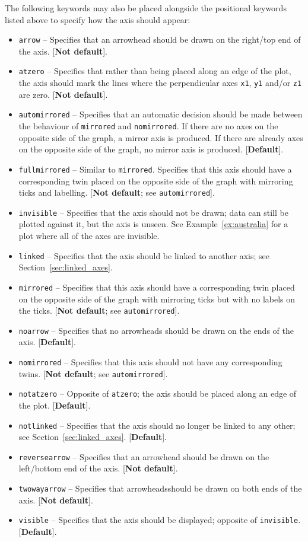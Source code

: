 The following keywords may also be placed alongside the positional keywords
listed above to specify how the axis should appear:
\begin{itemize}
\item {\tt arrow} -- Specifies that an arrowhead should be drawn on the right/top end of the axis. [{\bf Not default}].
\item {\tt atzero} -- Specifies that rather than being placed along an edge of the plot, the axis should mark the lines where the perpendicular axes {\tt x1}, {\tt y1} and/or {\tt z1} are zero. [{\bf Not default}].
\item {\tt automirrored} -- Specifies that an automatic decision should be made between the behaviour of {\tt mirrored} and {\tt nomirrored}. If there are no axes on the opposite side of the graph, a mirror axis is produced. If there are already axes on the opposite side of the graph, no mirror axis is produced. [{\bf Default}].
\item {\tt fullmirrored} -- Similar to {\tt mirrored}. Specifies that this axis should have a corresponding twin placed on the opposite side of the graph with mirroring ticks and labelling. [{\bf Not default}; see {\tt automirrored}].
\item {\tt invisible} -- Specifies that the axis should not be drawn; data can still be plotted against it, but the axis is unseen. See Example~\ref{ex:australia} for a plot where all of the axes are invisible.
\item {\tt linked} -- Specifies that the axis should be linked to another axis; see Section~\ref{sec:linked_axes}.
\item {\tt mirrored} -- Specifies that this axis should have a corresponding twin placed on the opposite side of the graph with mirroring ticks but with no labels on the ticks. [{\bf Not default}; see {\tt automirrored}].
\item {\tt noarrow} -- Specifies that no arrowheads should be drawn on the ends of the axis. [{\bf Default}].
\item {\tt nomirrored} -- Specifies that this axis should not have any corresponding twins. [{\bf Not default}; see {\tt automirrored}].
\item {\tt notatzero} -- Opposite of {\tt atzero}; the axis should be placed along an edge of the plot. [{\bf Default}].
\item {\tt notlinked} -- Specifies that the axis should no longer be linked to any other; see Section~\ref{sec:linked_axes}. [{\bf Default}].
\item {\tt reversearrow} -- Specifies that an arrowhead should be drawn on the left/bottom end of the axis. [{\bf Not default}].
\item {\tt twowayarrow} -- Specifies that arrowheadsshould be drawn on both ends of the axis. [{\bf Not default}].
\item {\tt visible} -- Specifies that the axis should be displayed; opposite of {\tt invisible}. [{\bf Default}].
\end{itemize}


